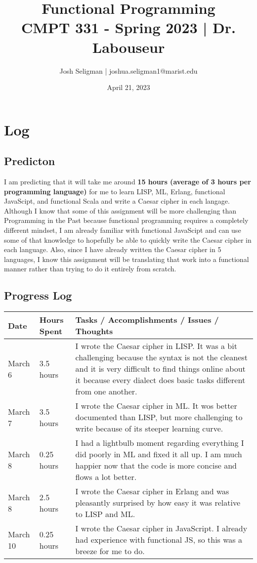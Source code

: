 \documentclass[letterpaper, 10pt, DIV=13]{scrartcl}
\title {
	\normalfont
	\huge{Functional Programming} \\
	\vspace{10pt}
	\large{CMPT 331 - Spring 2023 | Dr. Labouseur}
}
\author{\normalfont Josh Seligman | joshua.seligman1@marist.edu}
\date{\normalfont April 21, 2023}
\numberwithin{equation}{section}
\numberwithin{figure}{section}
\numberwithin{table}{section}
\begin{document}
\maketitle

\section{Log}
\subsection{Predicton}
I am predicting that it will take me around \textbf{15 hours (average of 3 hours per programming language)} for me to learn LISP, ML, Erlang, 
functional JavaScipt, and functional Scala and write a Caesar cipher in each langage. Although I know that some of this assignment will be more 
challenging than Programming in the Past because functional programming requires a completely different mindset, I am already familiar with 
functional JavaScipt and can use some of that knowledge to hopefully be able to quickly write the Caesar cipher in each language. Also, since I 
have already written the Caesar cipher in 5 languages, I know this assignment will be translating that work into a functional manner rather than 
trying to do it entirely from scratch. 

\subsection{Progress Log}
\begin{center}
	\begin{longtable}{|p{1in}|p{1in}|p{4in}|}
		\hline
		Date & Hours Spent & Tasks / Accomplishments / Issues / Thoughts
		\\
		\hline
        March 6 & 3.5 hours & I wrote the Caesar cipher in LISP. It was a bit challenging because the syntax is not the cleanest and it is very 
        difficult to find things online about it because every dialect does basic tasks different from one another.
        \\
		\hline
        March 7 & 3.5 hours & I wrote the Caesar cipher in ML. It wos better documented than LISP, but more challenging to write because of its 
        steeper learning curve.
        \\
        \hline
        March 8 & 0.25 hours & I had a lightbulb moment regarding everything I did poorly in ML and fixed it all up. I am much happier now that the code is
        more concise and flows a lot better.
        \\
        \hline
        March 8 & 2.5 hours & I wrote the Caesar cipher in Erlang and was pleasantly surprised by how easy it was relative to LISP and ML.
        \\
        \hline
        March 10 & 0.25 hours & I wrote the Caesar cipher in JavaScript. I already had experience with functional JS, so this was a breeze for me to do.
        \\
        \hline
	\end{longtable}
\end{center}
\end{document}
